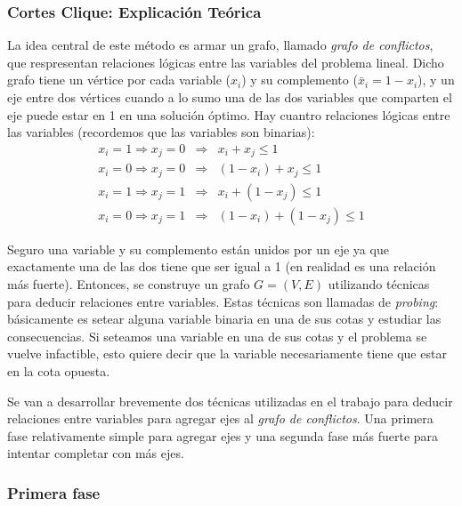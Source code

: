 \subsubsection{Cortes Clique: Explicación Teórica}

La idea central de este método es armar un grafo, llamado \textit{grafo de conflictos}, que respresentan relaciones l\'ogicas entre las variables del problema lineal. Dicho grafo tiene un v\'ertice por cada variable ($x_i$) y su complemento ($\bar{x}_i = 1 - x_i$), y un eje entre dos v\'ertices cuando a lo sumo una de las dos variables que comparten el eje puede estar en 1 en una soluci\'on \'optimo. Hay cuantro relaciones l\'ogicas entre las variables (recordemos que las variables son binarias): \\ 
\begin{eqnarray*}
x_i = 1 \Rightarrow x_j = 0 & \Longrightarrow & x_i + x_j \leq 1 \\
x_i = 0 \Rightarrow x_j = 0 & \Longrightarrow & (1 - x_i) + x_j \leq 1 \\
x_i = 1 \Rightarrow x_j = 1 & \Longrightarrow & x_i + (1 - x_j) \leq 1 \\
x_i = 0 \Rightarrow x_j = 1 & \Longrightarrow & (1 - x_i) + (1 - x_j) \leq 1 
\end{eqnarray*}

Seguro una variable y su complemento est\'an unidos por un eje ya que exactamente una de las dos tiene que ser igual a 1 (en realidad es una relaci\'on m\'as fuerte). Entonces, se construye un grafo $G = (V,E)$ utilizando t\'ecnicas para deducir relaciones entre variables. Estas t\'ecnicas son llamadas de \textit{probing}: b\'asicamente es setear alguna variable binaria en una de sus cotas y estudiar las consecuencias. Si seteamos una variable en una de sus cotas y el problema se vuelve infactible, esto quiere decir que la variable necesariamente tiene que estar en la cota opuesta.

Se van a desarrollar brevemente dos t\'ecnicas utilizadas en el trabajo para deducir relaciones entre variables para agregar ejes al \textit{grafo de conflictos}. Una primera fase relativamente simple para agregar ejes y una segunda fase m\'as fuerte para intentar completar con m\'as ejes.

\subsubsection*{Primera fase}

